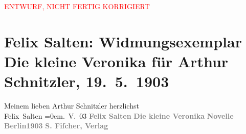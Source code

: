 
\begin{center}
            \textcolor{red}{ENTWURF, NICHT FERTIG KORRIGIERT}
                      \end{center}
            
         \renewcommand{\erwaehnteInstitutionen}{Institutionen: S. Fischer Verlag}
         \renewcommand{\erwaehnteOrte}{Orte: Berlin, Wien}
         \renewcommand{\erwaehnteWerke}{Werke: Die kleine Veronika. Novelle}
               \section[Felix Salten: Widmungsexemplar Die kleine Veronika für Arthur Schnitzler, 19. 5. 1903]{ Felix Salten: Widmungsexemplar Die kleine Veronika für Arthur
               Schnitzler, 19. 5. 1903}\nopagebreak{}\rehead{ }\begin{ledgroupsized}[t]{13cm}\normalsize\beginnumbering \toendnotes[C]{\smallbreak\pagebreak[2]} 
\pstart
           \noindent{}{\pb}Meinem lieben Arthur Schnitzler\pend
           \pstart
           herzlichst{\\[\baselineskip]}\spacefill\mbox{Felix Salten}\pend
           \leftskip=0em{}. V. 03\pend
           {\bigskip}\pstart
           \noindent{}\centering{}\textcolor{gray}{\textbf{Felix Salten}}\pend
           \pstart
           \noindent{}\centering{}\textcolor{gray}{\textbf{Die kleine Veronika}}\pend
           \pstart
           \noindent{}\centering{}\textcolor{gray}{\textbf{Novelle}}\pend
           {\bigskip}\pstart
           \noindent{}\centering{}\textcolor{gray}{\textbf{Berlin1903}}\pend
           \pstart
           \noindent{}\centering{}\textcolor{gray}{\textbf{S. Fiſcher, Verlag}}\pend
           
         
         \endnumbering{}\end{ledgroupsized}\begin{anhang}\end{anhang}\newcommand{\dateiname}{L03041}\newcommand{\titel}{Felix Salten: Widmungsexemplar Die kleine Veronika für Arthur Schnitzler, 19. 5. 1903}\newcommand{\editorInnen}{Martin Anton Müller und Laura Untner}
      